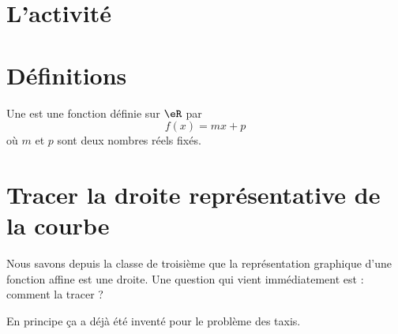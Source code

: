 \section{L'activité}



\section{Définitions}

\begin{definition}
    Une  est une fonction définie sur \( \eR\) par
    \begin{equation}
        f(x)=mx+p
    \end{equation}
    où \( m\) et \( p\) sont deux nombres réels fixés.
\end{definition}

\section{Tracer la droite représentative de la courbe}

Nous savons depuis la classe de troisième que la représentation graphique d'une fonction affine est une droite. Une question qui vient immédiatement est : comment la tracer ?

En principe ça a déjà été inventé pour le problème des taxis.


